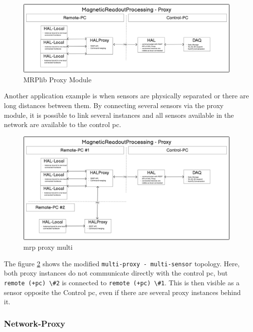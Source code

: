 \begin{figure}
\centering
\includegraphics{./generated_images/border_MRPlib_Proxy_Module.png}
\caption{MRPlib Proxy Module \label{MRPlib_Proxy_Module.png}}
\end{figure}

Another application example is when sensors are physically separated or
there are long distances between them. By connecting several sensors via
the proxy module, it is possible to link several instances and all
sensors available in the network are available to the control \gls{pc}.

\begin{figure}
\centering
\includegraphics{./generated_images/border_mrp_proxy_multi.png}
\caption{mrp proxy multi \label{mrp_proxy_multi.png}}
\end{figure}

The figure \ref{mrp_proxy_multi.png} shows the modified
\passthrough{\lstinline!multi-proxy - multi-sensor!} topology. Here,
both proxy instances do not communicate directly with the control
\gls{pc}, but \passthrough{\lstinline!remote (+pc) \#2!} is connected to
\passthrough{\lstinline!remote (+pc) \#1!}. This is then visible as a
sensor opposite the Control \gls{pc}, even if there are several proxy
instances behind it.

\hypertarget{network-proxy}{%
\subsubsection{Network-Proxy}\label{network-proxy}}

